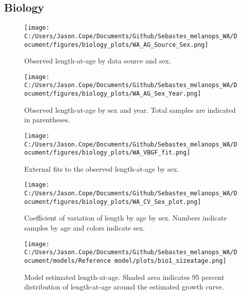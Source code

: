 \documentclass[11pt,
  english,
  letterpaper,
]{article}
\begin{document}
\pagebreak

\hypertarget{biology}{%
\subsection{Biology}\label{biology}}

\begin{figure}
\centering
\texttt{[image: C:/Users/Jason.Cope/Documents/Github/Sebastes\_melanops\_WA/Document/figures/biology\_plots/WA\_AG\_Source\_Sex.png]}
\caption{Observed length-at-age by data source and sex.\label{fig:len-age-data-sex}}
\end{figure}

\pagebreak

\begin{figure}
\centering
\texttt{[image: C:/Users/Jason.Cope/Documents/Github/Sebastes\_melanops\_WA/Document/figures/biology\_plots/WA\_AG\_Sex\_Year.png]}
\caption{Observed length-at-age by sex and year. Total samples are indicated in parentheses.\label{fig:len-age-sex-year}}
\end{figure}

\pagebreak

\begin{figure}
\centering
\texttt{[image: C:/Users/Jason.Cope/Documents/Github/Sebastes\_melanops\_WA/Document/figures/biology\_plots/WA\_VBGF\_fit.png]}
\caption{External fits to the observed length-at-age by sex.\label{fig:len-age-fit}}
\end{figure}

\pagebreak

\begin{figure}
\centering
\texttt{[image: C:/Users/Jason.Cope/Documents/Github/Sebastes\_melanops\_WA/Document/figures/biology\_plots/WA\_CV\_Sex\_plot.png]}
\caption{Coefficient of variation of length by age by sex. Numbers indicate samples by age and colors indicate sex.\label{fig:cv-lt-age}}
\end{figure}

\pagebreak

\begin{figure}
\centering
\texttt{[image: C:/Users/Jason.Cope/Documents/Github/Sebastes\_melanops\_WA/Document/models/Reference model/plots/bio1\_sizeatage.png]}
\caption{Model estimated length-at-age. Shaded area indicates 95 percent distribution of length-at-age around the estimated growth curve.\label{fig:len-age-ss}}
\end{figure}
\end{document}
